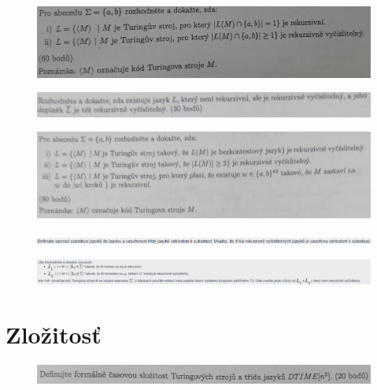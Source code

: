 \documentclass[]{article}
\begin{document}
	\begin{figure}[H]
		\includegraphics[width=\textwidth]{tasks/redukcie/task4.png}
	\end{figure}

	\begin{figure}[H]
		\includegraphics[width=\textwidth]{tasks/redukcie/task5.png}
	\end{figure}

	\begin{figure}[H]
		\includegraphics[width=\textwidth]{tasks/redukcie/task6.png}
	\end{figure}

	\begin{figure}[H]
		\includegraphics[width=\textwidth]{tasks/redukcie/task7.png}
	\end{figure}
	
	\begin{figure}[H]
		\includegraphics[width=\textwidth]{tasks/redukcie/task8.png}
	\end{figure}
	
	\section{Zložitosť}
	
	\begin{figure}[H]
		\includegraphics[width=\textwidth]{tasks/zlozitost/task1.png}
	\end{figure}
\end{document}
